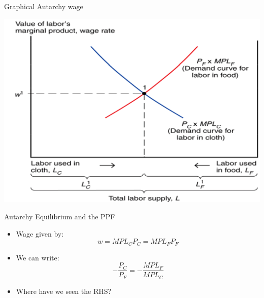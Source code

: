 \documentclass[ignorenonframetext,]{beamer}
\begin{document}
\begin{frame}{Graphical Autarchy wage}

    \includegraphics[scale=0.25]{aut_wage.png}

\end{frame}

\begin{frame}{Autarchy Equilibrium and the PPF}

    \begin{itemize}
        \item Wage given by:
            \begin{equation*}
                w = MPL_C P_C = MPL_F P_F 
            \end{equation*}
        \item We can write:
            \begin{equation*}
                -\frac{P_C}{P_F} = -\frac{MPL_F}{MPL_C}
            \end{equation*}
        \item Where have we seen the RHS?
    \end{itemize}

\end{frame}
\end{document}
